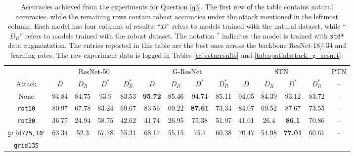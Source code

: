 \begin{table}[t]
\caption{Accuracies achieved from the experiments for Question \ref{q3}. The first row of the table contains natural accuracies, while the remaining rows contain robust accuracies under the attack mentioned in the leftmost column. Each model has four columns of results: ``$D$'' refers to models trained with the natural dataset, while ``$D_R$'' refers to models trained with the robust dataset. The notation $^*$ indicates the model is trained with \texttt{std*} data augmentation. The entries reported in this table are the best ones across the backbone ResNet-18/-34 and learning rates. The raw experiment data is logged in Tables \ref{tab:stnresults} and \ref{tab:spatialattack_g_resnet}.} \label{tab:spatialattack}
    \begin{adjustwidth}{-.5in}{-.5in}  
        \vspace{15pt}
        \begin{center}
            \begin{tabular}{|c|cccc|cccc|cccc|c|}
                \hline
                & \multicolumn{4}{c|}{ResNet-50} & \multicolumn{4}{c|}{G-ResNet} & \multicolumn{4}{c|}{STN} & PTN\footnotemark \\
                Attack & $D$ & $D_R$ & $D^*$ & $D_R^*$ & $D$ & $D_R$ & $D^*$ & $D_R^*$ & $D$ & $D_R$ & $D^*$ & $D_R^*$ & -- \\ 
                \hline
                None &
                94.84 & 84.75 & 93.9 & 83.53 &  %
                \textbf{95.72} & 85.46 & 94.74 & 85.11 &  %
                94.05 & 84.39 & 93.12 & 83.72 &   %
                -- \\
                \texttt{rot10} &
                80.97 & 67.78 & 83.24 & 69.67 &  %
                83.56 & 69.22 & \textbf{87.61} & 73.34 &  %
                84.07 & 69.52 & 87.67 & 73.55 &   %
                -- \\
                \texttt{rot30} &
                36.77 & 24.94 & 58.75 & 42.62 &  %
                41.74 & 26.95 & 75.38 & 51.97 &  %
                41.01 & 26.4 & \textbf{86.1} & 70.86 &  %
                -- \\
                \texttt{grid775,10$^\circ$} &
                63.34 & 52.3 & 67.78 & 55.31 &  %
                68.17 & 55.15 & 75.7 & 60.38 & %
                70.47 & 54.98 & \textbf{77.01} & 60.61 &   %
                -- \\
                \texttt{grid135} &

\end{tabular}
\end{center}
\end{adjustwidth}
\end{table}
